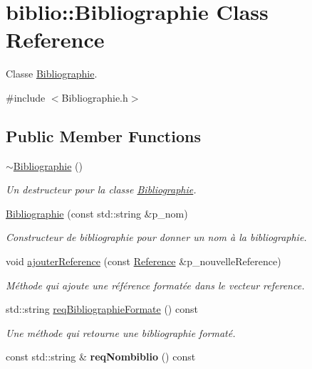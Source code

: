 \hypertarget{classbiblio_1_1Bibliographie}{}\section{biblio\+:\+:Bibliographie Class Reference}
\label{classbiblio_1_1Bibliographie}


Classe \hyperlink{classbiblio_1_1Bibliographie}{Bibliographie}.  




{\ttfamily \#include $<$Bibliographie.\+h$>$}

\subsection*{Public Member Functions}
\begin{DoxyCompactItemize}
\item 
\hyperlink{classbiblio_1_1Bibliographie_a428979a1e88667d8dfc9ffb718a17dcf}{$\sim$\+Bibliographie} ()\hypertarget{classbiblio_1_1Bibliographie_a428979a1e88667d8dfc9ffb718a17dcf}{}\label{classbiblio_1_1Bibliographie_a428979a1e88667d8dfc9ffb718a17dcf}

\begin{DoxyCompactList}\small\item\em Un destructeur pour la classe \hyperlink{classbiblio_1_1Bibliographie}{Bibliographie}. \end{DoxyCompactList}\item 
\hyperlink{classbiblio_1_1Bibliographie_a04e86ad04d5e0510f7c6edd2c23358d6}{Bibliographie} (const std\+::string \&p\+\_\+nom)
\begin{DoxyCompactList}\small\item\em Constructeur de bibliographie pour donner un nom à la bibliographie. \end{DoxyCompactList}\item 
void \hyperlink{classbiblio_1_1Bibliographie_aa873f6c1a158c807072f91f3a5b33947}{ajouter\+Reference} (const \hyperlink{classbiblio_1_1Reference}{Reference} \&p\+\_\+nouvelle\+Reference)
\begin{DoxyCompactList}\small\item\em Méthode qui ajoute une référence formatée dans le vecteur reference. \end{DoxyCompactList}\item 
std\+::string \hyperlink{classbiblio_1_1Bibliographie_a6b503d643c36f9af56b3b85708e3bbe8}{req\+Bibliographie\+Formate} () const 
\begin{DoxyCompactList}\small\item\em Une méthode qui retourne une bibliographie formaté. \end{DoxyCompactList}\item 
const std\+::string \& {\bfseries req\+Nombiblio} () const \hypertarget{classbiblio_1_1Bibliographie_aeb99e2bdcde93a6eea2b30afabba7f26}{}\label{classbiblio_1_1Bibliographie_aeb99e2bdcde93a6eea2b30afabba7f26}

\end{DoxyCompactItemize}


